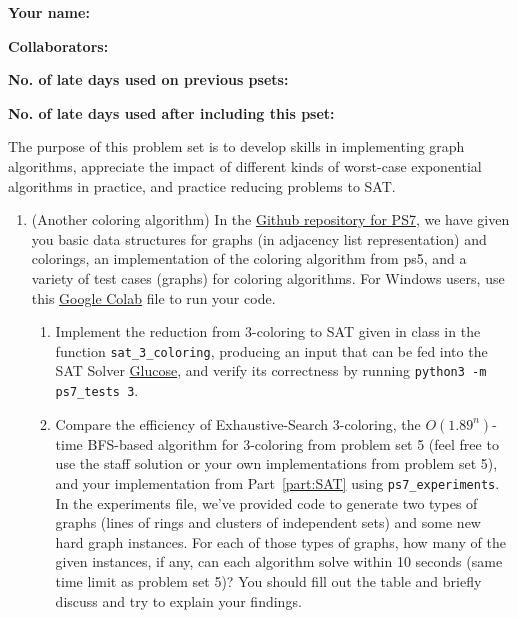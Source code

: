 \documentclass[11pt]{article}
\begin{document}

\textbf{Your name: }

\textbf{Collaborators: }

\textbf{No. of late days used on previous psets: }

\textbf{No. of late days used after including this pset: }


The purpose of this problem set is to develop skills in implementing graph algorithms, appreciate the impact of different kinds of worst-case exponential algorithms in practice, and practice reducing problems to SAT.
\begin{enumerate}

    \item (Another coloring algorithm) 
  In the \href{https://github.com/Harvard-CS-120/cs120/tree/main/fall2023/psets/ps7}{Github repository for PS7}, we have given you basic data structures for graphs (in adjacency list representation) and colorings, an implementation of the coloring algorithm from ps5, and a variety of test cases (graphs) for coloring algorithms. For Windows users, use this \href{https://colab.research.google.com/drive/13nMhNMaDstVaEkxye61m8AV7nk9ks9uS#scrollTo=AbIalcylVVuu}{Google Colab} file to run your code.
  
  \begin{enumerate}
      
      \item Implement the reduction from 3-coloring to SAT given in class in the function \texttt{sat\_3\_coloring}, producing an input that can be fed into the SAT Solver \href{https://pysathq.github.io/usage/}{Glucose}, and verify its correctness by running \texttt{python3 -m ps7\_tests 3}. \label{part:SAT}

      \item Compare the efficiency of Exhaustive-Search 3-coloring, the $O(1.89^n)$-time BFS-based algorithm for 3-coloring from problem set 5 (feel free to use the staff solution or your own implementations from problem set 5), and your implementation from  Part~\ref{part:SAT} using \texttt{ps7\_experiments}. In the experiments file, we've provided code to generate two types of graphs (lines of rings and clusters of independent sets) and some new hard graph instances. For each of those types of graphs, how many of the given instances, if any, can each algorithm solve within 10 seconds (same time limit as problem set 5)? You should fill out the table and briefly discuss and try to explain your findings.


\end{enumerate}
\end{enumerate}
\end{document}
